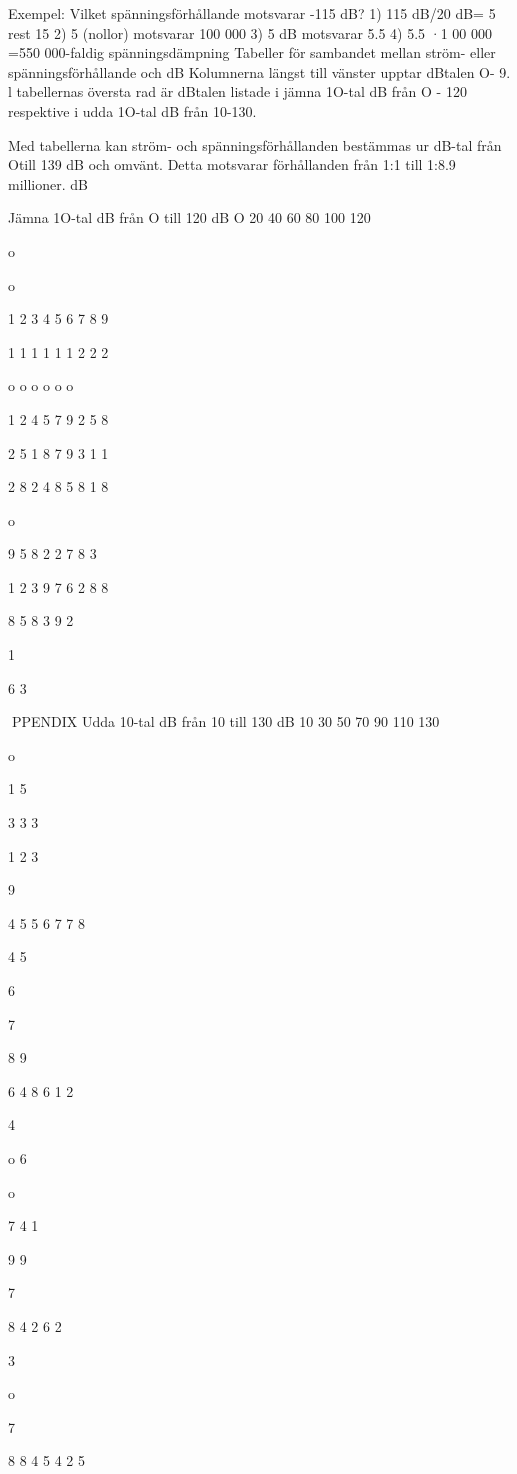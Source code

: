 Exempel: Vilket spänningsförhållande motsvarar -115 dB?
1) 115 dB/20 dB= 5 rest 15
2) 5 (nollor) motsvarar 100 000
3) 5 dB motsvarar 5.5
4) 5.5 ·1 00 000 =550 000-faldig spänningsdämpning
Tabeller för sambandet mellan ström- eller spänningsförhållande och dB
Kolumnerna längst till vänster upptar dBtalen O- 9. l tabellernas översta rad är dBtalen listade i jämna 1O-tal dB från O - 120
respektive i udda 1O-tal dB från 10-130.

Med tabellerna kan ström- och spänningsförhållanden bestämmas ur dB-tal från Otill
139 dB och omvänt.
Detta motsvarar förhållanden från 1:1 till
1:8.9 millioner.
dB

Jämna 1O-tal dB från O till 120 dB
O 20 40 60 80 100 120

o

o

1
2
3
4
5
6
7
8
9

1
1
1
1
1
1
2
2
2

o o o o o o

1
2
4
5
7
9
2
5
8

2
5
1
8
7
9
3
1
1

2
8
2
4
8
5
8
1
8

o

9
5
8
2
2
7
8
3

1
2
3
9
7
6
2
8
8

8
5
8
3
9
2

1

6
3

PPENDIX
Udda 10-tal dB från 10 till 130 dB
10 30 50 70 90 110 130

o

1
5

3
3
3

1
2
3

9

4
5
5
6
7
7
8

4
5

6

7

8
9

6
4
8
6
1
2

4

o
6

o

7
4
1

9
9

7

8
4
2
6
2

3

o

7

8
8
4
5
4
2
5

